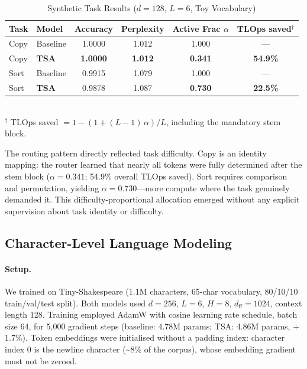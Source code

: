 \documentclass{article}
\newcommand{\tsa}{TSA\xspace}
\begin{document}
\begin{table}[h]
\centering
\caption{Synthetic Task Results ($d{=}128$, $L{=}6$, Toy Vocabulary)}
\label{tab:synthetic}
\small
\begin{tabular}{llcccc}
\toprule
Task & Model & Accuracy & Perplexity & Active Frac $\alpha$ & TLOps saved$^\dagger$ \\
\midrule
Copy & Baseline & 1.0000 & 1.012 & 1.000 & --- \\
Copy & \textbf{TSA}  & \textbf{1.0000} & \textbf{1.012} & \textbf{0.341} & \textbf{54.9\%} \\
\midrule
Sort & Baseline & 0.9915 & 1.079 & 1.000 & --- \\
Sort & \textbf{TSA}  & 0.9878 & 1.087 & \textbf{0.730} & \textbf{22.5\%} \\
\bottomrule
\end{tabular}
\\[3pt]
{\footnotesize $^\dagger$ TLOps saved $= 1 - (1 + (L-1)\,\alpha)/L$, including the mandatory stem block.}
\end{table}

The routing pattern directly reflected task difficulty. Copy is an identity mapping:
the router learned that nearly all tokens were fully determined after the stem block
($\alpha = 0.341$; 54.9\% overall TLOps saved).
Sort requires comparison and permutation, yielding $\alpha = 0.730$---more compute
where the task genuinely demanded it. This difficulty-proportional allocation emerged
without any explicit supervision about task identity or difficulty.

\subsection{Character-Level Language Modeling}
\label{sec:lm}

\paragraph{Setup.}
We trained on Tiny-Shakespeare \citep{karpathy2015charray} (1.1M characters, 65-char
vocabulary, 80/10/10 train/val/test split). Both models used $d{=}256$, $L{=}6$,
$H{=}8$, $d_\mathrm{ff}{=}1024$, context length 128. Training employed AdamW with
cosine learning rate schedule, batch size 64, for 5{,}000 gradient steps (baseline:
4.78M params; \tsa: 4.86M params, $+$1.7\%). Token embeddings were initialised
without a padding index: character index 0 is the newline character
(\textasciitilde{}8\% of the corpus), whose embedding gradient must not be zeroed.
\end{document}
